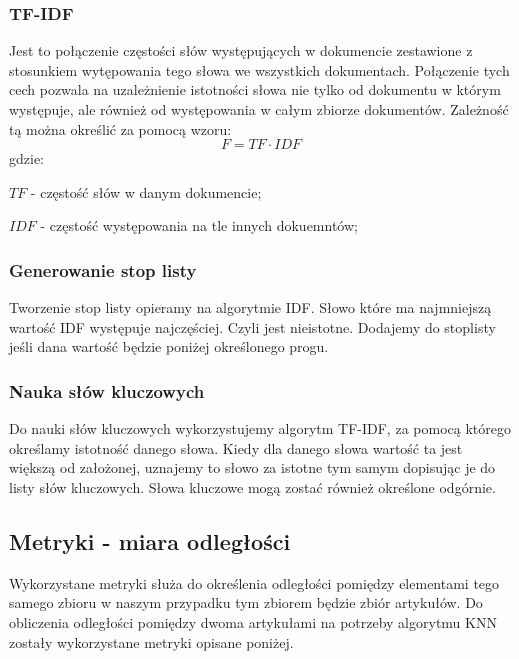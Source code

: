 \documentclass{classrep}
\begin{document}
\subsubsection{TF-IDF}
Jest to połączenie częstości słów występujących w dokumencie zestawione z stosunkiem wytępowania tego słowa we wszystkich
dokumentach. Połączenie tych cech pozwala na uzależnienie istotności słowa nie tylko od dokumentu w którym występuje,
ale również od występowania w całym zbiorze dokumentów. Zależność tą można określić za pomocą wzoru:
\begin{equation}
    F={TF}\cdot{IDF}
\end{equation}
gdzie:\\
\begin{description}
    \item $TF$ - częstość słów w danym dokumencie;
    \item $IDF$ - częstość występowania na tle innych dokuemntów;
\end{description}

\subsubsection{Generowanie stop listy}
Tworzenie stop listy opieramy na algorytmie IDF. Słowo które ma najmniejszą wartość IDF występuje najczęściej. Czyli jest
nieistotne. Dodajemy do stoplisty jeśli dana wartość będzie poniżej określonego progu.

\subsubsection{Nauka słów kluczowych}
Do nauki słów kluczowych wykorzystujemy algorytm TF-IDF, za pomocą którego określamy istotność
danego słowa. Kiedy dla danego słowa wartość ta jest większą od założonej, uznajemy to słowo za istotne tym samym dopisując je do
listy słów kluczowych. Słowa kluczowe mogą zostać również określone odgórnie.

\subsection{Metryki - miara odległości} \label{wykorzystane_metryki}
Wykorzystane metryki służa do określenia odległości pomiędzy elementami tego samego zbioru w naszym przypadku tym
zbiorem będzie zbiór artykułów. Do obliczenia odległości pomiędzy dwoma artykułami na potrzeby algorytmu KNN zostały
wykorzystane metryki opisane poniżej.
\end{document}
